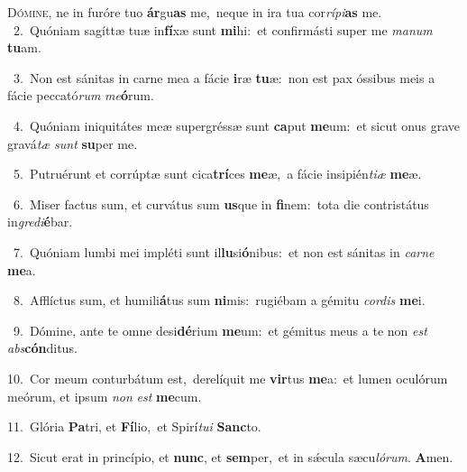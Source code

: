 \lettrine{\initial\textcolor{\initialcolor}{D}}{ómine,} ne in furóre tuo \textbf{ár}\-gu\textbf{as} me,~\star neque in ira tua cor\-\textit{rí}\-\textit{pi}\textbf{as} me.\\
{\numbfont\textcolor{\numbcolor}{~2.}}~Quóniam sagíttæ tuæ in\-\textbf{fí}\-xæ sunt \textbf{mi}\-hi:~\star et confirmásti super me \textit{ma}\-\textit{num} \textbf{tu}\-am.\par
{\numbfont\textcolor{\numbcolor}{~3.}}~Non est sánitas in carne mea a fácie \textbf{i}\-ræ \textbf{tu}\-æ:~\star non est pax óssibus meis a fácie peccató\textit{rum} \textit{me}\-\textbf{ó}rum.\par
{\numbfont\textcolor{\numbcolor}{~4.}}~Quóniam iniquitátes meæ supergréssæ sunt \textbf{ca}\-put \textbf{me}\-um:~\star et sicut onus grave gravá\textit{tæ} \textit{sunt} \textbf{su}\-per me.\par
{\numbfont\textcolor{\numbcolor}{~5.}}~Putruérunt et corrúptæ sunt cica\-\textbf{trí}\-ces \textbf{me}\-æ,~\star a fácie insipién\-\textit{ti}\-\textit{æ} \textbf{me}\-æ.\par
{\numbfont\textcolor{\numbcolor}{~6.}}~Miser factus sum, et curvátus sum \textbf{us}\-que in \textbf{fi}\-nem:~\star tota die contristátus in\-\textit{gre}\-\textit{di}\textbf{é}bar.\par
{\numbfont\textcolor{\numbcolor}{~7.}}~Quóniam lumbi mei impléti sunt il\-\textbf{lu}\-si\-\textbf{ó}\-nibus:~\star et non est sánitas in \textit{car}\-\textit{ne} \textbf{me}\-a.\par
{\numbfont\textcolor{\numbcolor}{~8.}}~Afflíctus sum, et humili\-\textbf{á}\-tus sum \textbf{ni}\-mis:~\star rugiébam a gémitu \textit{cor}\-\textit{dis} \textbf{me}\-i.\par
{\numbfont\textcolor{\numbcolor}{~9.}}~Dómine, ante te omne desi\-\textbf{dé}\-rium \textbf{me}\-um:~\star et gémitus meus a te non \textit{est} \textit{abs}\-\textbf{cón}ditus.\par
{\numbfont\textcolor{\numbcolor}{10.}}~Cor meum conturbátum est,~\dagger derelíquit me \textbf{vir}\-tus \textbf{me}\-a:~\star et lumen oculórum meórum, et ipsum \textit{non} \textit{est} \textbf{me}\-cum.\par
{\numbfont\textcolor{\numbcolor}{11.}}~Glória \textbf{Pa}\-tri, et \textbf{Fí}\-lio,~\star et Spirí\-\textit{tu}\-\textit{i} \textbf{Sanc}\-to.\par
{\numbfont\textcolor{\numbcolor}{12.}}~Sicut erat in princípio, et \textbf{nunc}\-, et \textbf{sem}\-per,~\star et in sǽcula sæcu\-\textit{ló}\-\textit{rum}. \textbf{A}\-men.\par
